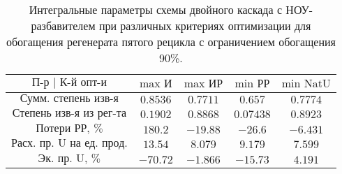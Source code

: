\begin{table}
\begin{tabular}{ccccc}
    $\text{П-р | К-й опт-и}$ & $\text{max И}$ & $\text{max ИР}$ & $\text{min РР}$ & $\text{min NatU}$\\ \hline
    $\text{Сумм. степень изв-я}$ & $0.8536$ & $0.7711$ & $0.657$ & $0.7774$\\ \hline
    $\text{Степень изв-я из рег-та}$ & $0.1902$ & $0.8868$ & $0.07438$ & $0.8923$\\ \hline        
    $\text{Потери РР, \%}$ & $180.2$ & $-19.88$ & $-26.6$ & $-6.431$\\ \hline
    $\text{Расх. пр. U на ед. прод.}$ & $13.54$ & $8.079$ & $9.179$ & $7.599$\\ \hline
    $\text{Эк. пр. U, \%}$ & $-70.72$ & $-1.866$ & $-15.73$ & $4.191$
\end{tabular}
\caption{Интегральные параметры схемы двойного каскада с НОУ-разбавителем при различных критериях оптимизации для обогащения регенерата пятого рецикла с ограничением обогащения 90\%.{\label{2opt5_90_int}}}
\end{table}


